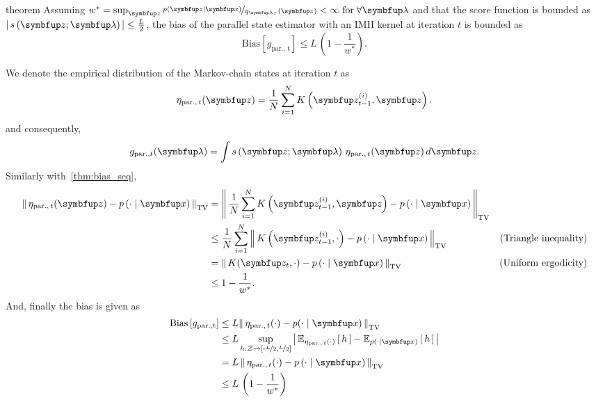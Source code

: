 
\begin{theoremEnd}{theorem}
  Assuming \(w^* = \sup_{\vz} \nicefrac{p\left(\vz\mid\vx\right)}{q_{\vlambda_{\tau}}\left(\vz\right)} < \infty \; \text{for}\;\forall \vlambda \) and that the score function is bounded as \(\left|\, s\left(\vz; \vlambda\right) \,\right| \leq \frac{L}{2}\), the bias of the parallel state estimator with an IMH kernel at iteration \(t\) is bounded as
  {\small
\[
    \mathrm{Bias}\left[ g_{\mathrm{par.,\, t}} \right] \leq L\, \left(1 - \frac{1}{w^*}\right).
\]
  }
\end{theoremEnd}
\begin{proofEnd}
  We denote the empirical distribution of the Markov-chain states at iteration \(t\) as
  \begin{align}
    \eta_{\mathrm{par.},\, t}(\vz) = \frac{1}{N} \sum_{i=1}^N K\left(\vz_{t-1}^{(i)}, \vz\right).
  \end{align}
  and consequently,
  \begin{align}
      g_{\mathrm{par.}, t}(\vlambda) = \int s\left(\vz; \vlambda\right) \, \eta_{\mathrm{par.},\, t}(\vz) \, d\vz.
  \end{align}
  Similarly with~\cref{thm:bias_seq}, 
  \begin{align}
    \DTV{ \eta_{\mathrm{par.},\, t}(\vz) }{p\left(\cdot\mid\vx\right)}
    &= \DTV{\frac{1}{N} \sum_{i=1}^N K\left(\vz_{t-1}^{(i)}, \vz\right)}{p\left(\cdot\mid\vx\right)} \\
    &\leq \frac{1}{N} \sum_{i=1}^N  \DTV{K\left(\vz_{t-1}^{(i)}, \cdot\right)}{p\left(\cdot\mid\vx\right)} &\text{(Triangle inequality)} \\
    &=    \DTV{K(\vz_t, \cdot)}{p\left(\cdot\mid\vx\right)} &\text{(Uniform ergodicity)} \\
    &\leq 1 - \frac{1}{w^*}.
  \end{align}
  And, finally the bias is given as
 \begin{align}
   \mathrm{Bias}\left[ g_{\mathrm{par., t}} \right]
   &\leq L \DTV{\eta_{\mathrm{par.},\, t}(\cdot)}{p(\cdot\mid\vx)} \\
   &\leq L \sup_{h : \mathcal{Z} \rightarrow \left[ \text{-}\nicefrac{L}{2}, \nicefrac{L}{2} \right]} \left|\, \Esub{\eta_{\mathrm{par.},\, t}(\cdot)}{h} - \Esub{p(\cdot\mid\vx)}{h} \,\right| \\
   &= L\, \DTV{ \eta_{\mathrm{par.},\, t}(\cdot) }{p\left(\cdot\mid\vx\right)}  \\
   &\leq L \, \left(1 - \frac{1}{w^*}\right)
 \end{align}
\end{proofEnd}

